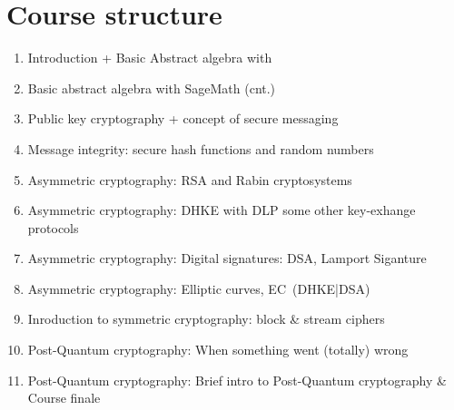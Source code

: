 \documentclass{article}
\begin{document}
\newpage

\section*{Course structure}
\begin{enumerate}
    \item Introduction + Basic Abstract algebra with 
    \item Basic abstract algebra with SageMath (cnt.)
    \item Public key cryptography + concept of secure messaging %
    \item Message integrity: secure hash functions and random numbers
    \item Asymmetric cryptography: RSA and Rabin cryptosystems
    \item Asymmetric cryptography: DHKE with DLP some other key-exhange protocols 
    \item Asymmetric cryptography: Digital signatures: DSA, Lamport Siganture
    \item Asymmetric cryptography: Elliptic curves, EC~(DHKE|DSA)
    \item Inroduction to symmetric cryptography: block \& stream ciphers
    \item Post-Quantum cryptography: When something went (totally) wrong
    \item Post-Quantum cryptography: Brief intro to Post-Quantum cryptography \& Course finale
\end{enumerate}
\end{document}
